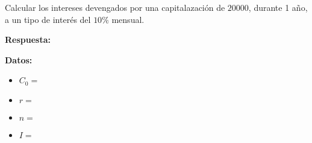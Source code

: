 \documentclass[12pt]{examdesign}
\theoremstyle{plain}
\theoremstyle{definition}
\theoremstyle{remark}
\begin{document}
\begin{shortanswer}[title={Leemos el material de consulta y realizamos las actividades propuestas.}, rearrange=no]
        \begin{question}
        	Calcular los intereses devengados por una capitalazación de $20000$, durante 1 año, a un tipo de interés del $10\%$ mensual.
        	\begin{answer}
        		\textbf{Respuesta:}
        		
        		\textbf{Datos:}
        		\begin{itemize}
        			\item $C_{0}=$
        			\item $r=$
        			\item $n=$
        			\item $I=$
        		\end{itemize}
        	\end{answer}
        \end{question}
    \end{shortanswer}
\end{document}
